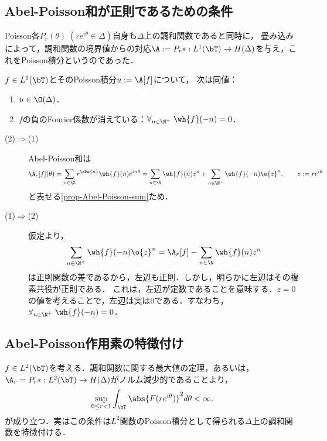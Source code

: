 \documentclass[uplatex,dvipdfmx]{jsreport}
\begin{document}
\subsection{Abel-Poisson和が正則であるための条件}

\begin{notation}
    Poisson各$P_r(\theta)\;(re^{i\theta}\in\Delta)$自身も$\Delta$上の調和関数であると同時に，
    畳み込みによって，調和関数の境界値からの対応$\A:=P_r*:L^1(\bT)\to H(\Delta)$を与え，これをPoisson積分というのであった．
\end{notation}

\begin{proposition}
    $f\in L^1(\bT)$とそのPoisson積分$u:=\A[f]$について，
    次は同値：
    \begin{enumerate}
        \item $u\in\O(\Delta)$．
        \item $f$の負のFourier係数が消えている：$\forall_{n\in\N^+}\;\wh{f}(-n)=0$．
    \end{enumerate}
\end{proposition}
\begin{Proof}\mbox{}
    \begin{description}
        \item[(2)$\Rightarrow$(1)] Abel-Poisson和は
        \[\A_r[f](\theta)=\sum_{n\in\Z}r^{\abs{n}}\wh{f}(n)e^{in\theta}=\sum_{n\in\N}\wh{f}(n)z^n+\sum_{n\in\N^+}\wh{f}(-n)\o{z}^n,\qquad z:=re^{i\theta}\]
        と表せる\ref{prop-Abel-Poisson-sum}ため．
        \item[(1)$\Rightarrow$(2)] 仮定より，
        \[\sum_{n\in\N^+}\wh{f}(-n)\o{z}^n=\A_r[f]-\sum_{n\in\N}\wh{f}(n)z^n\]
        は正則関数の差であるから，左辺も正則．しかし，明らかに左辺はその複素共役が正則である．
        これは，左辺が定数であることを意味する．$z=0$の値を考えることで，左辺は実は$0$である．すなわち，$\forall_{n\in\N^+}\;\wh{f}(-n)=0$．
    \end{description}
\end{Proof}

\subsection{Abel-Poisson作用素の特徴付け}

\begin{observation}
    $f\in L^2(\bT)$を考える．調和関数に関する最大値の定理，あるいは，$\A_r=P_r*:L^2(\bT)\to H(\Delta)$がノルム減少的であることより，
    \[\sup_{0\le r<1}\int_\bT\abs{F(re^{i\theta})}^2d\theta<\infty.\]
    が成り立つ．実はこの条件は$L^2$関数のPoisson積分として得られる$\Delta$上の調和関数を特徴付ける．
\end{observation}
\end{document}
